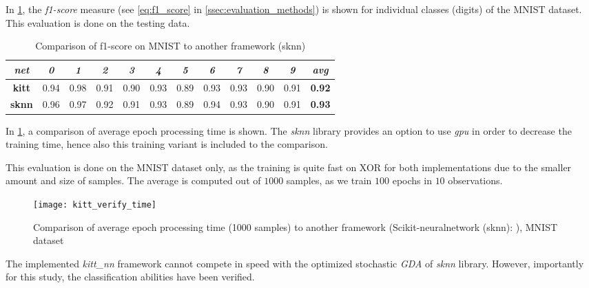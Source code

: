In \cref{tab:kitt_verify_f1}, the \textit{f1-score} measure (see \cref{eq:f1_score} in \cref{ssec:evaluation_methods}) is shown for individual classes (digits) of the MNIST dataset. This evaluation is done on the testing data.

\begin{table}[H]
\centering
\caption{Comparison of f1-score on MNIST to another framework (sknn)}
\label{tab:kitt_verify_f1}
\resizebox{\textwidth}{!} {
\begin{tabular}{|c|c|c|c|c|c|c|c|c|c|c|c|}
\hline
\textit{net}  & \textit{0} & \textit{1} & \textit{2} & \textit{3} & \textit{4} & \textit{5} & \textit{6} & \textit{7} & \textit{8} & \textit{9} & \textit{avg}  \\ \hline
\textbf{kitt} & 0.94       & 0.98       & 0.91       & 0.90       & 0.93       & 0.89       & 0.93       & 0.93       & 0.90       & 0.91       & \textbf{0.92} \\ \hline
\textbf{sknn} & 0.96       & 0.97       & 0.92       & 0.91       & 0.93       & 0.89       & 0.94       & 0.93       & 0.90       & 0.91       & \textbf{0.93} \\ \hline
\end{tabular}
}
\end{table}

In \cref{fig:kitt_verify_time}, a comparison of average epoch processing time is shown. The \textit{sknn} library provides an option to use \textit{gpu} in order to decrease the training time, hence also this training variant is included to the comparison.

This evaluation is done on the MNIST dataset only, as the training is quite fast on XOR for both implementations due to the smaller amount and size of samples. The average is computed out of $ 1000 $ samples, as we train $ 100 $ epochs in $ 10 $ observations.

\begin{figure}[H]
  \centering
  \texttt{[image: kitt\_verify\_time]}
  \caption{Comparison of average epoch processing time (1000 samples) to another framework (Scikit-neuralnetwork (sknn): \citep{misc:sknn}), MNIST dataset}
  \label{fig:kitt_verify_time}
\end{figure}

The implemented \textit{kitt\_nn} framework cannot compete in speed with the optimized stochastic \textit{GDA} of \textit{sknn} library. However, importantly for this study, the classification abilities have been verified.

